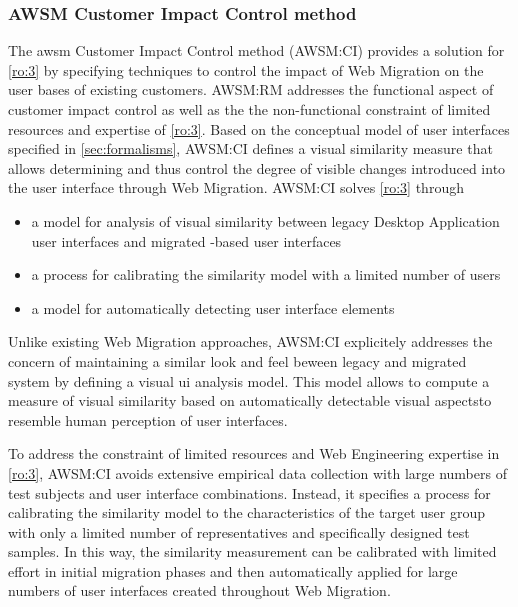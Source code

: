 \hypertarget{awsm-customer-impact-control-method}{%
\subsubsection*{AWSM Customer Impact Control method}\label{awsm-customer-impact-control-method}}

The \gls{awsm} Customer Impact Control method (AWSM:CI) provides a solution for \cref{ro:3} by specifying techniques to control the impact of \gls{Web Migration} on the user bases of existing customers. %
AWSM:RM addresses the functional aspect of customer impact control as well as the the non-functional constraint of limited resources and expertise of \cref{ro:3}.
Based on the conceptual model of  user interfaces specified in \cref{sec:formalisms}, AWSM:CI defines a visual similarity measure that allows determining and thus control the degree of visible changes introduced into the user interface through \gls{Web Migration}.
AWSM:CI solves \cref{ro:3} through
\begin{itemize}
\item a model for analysis of visual similarity between legacy \gls{Desktop Application} user interfaces and migrated -based user interfaces
\item a process for calibrating the similarity model with a limited number of users
\item a model for automatically detecting user interface elements
\end{itemize}

\par\smallskip
Unlike existing \gls{Web Migration} approaches, AWSM:CI explicitely addresses the concern of maintaining a similar look and feel beween legacy and migrated system by defining a visual \gls{ui} analysis model.
This model allows to compute a measure of visual similarity based on automatically detectable visual aspectsto resemble human perception of user interfaces.

To address the constraint of limited resources and \gls{Web Engineering} expertise in \cref{ro:3}, AWSM:CI avoids extensive empirical data collection with large numbers of test subjects and user interface combinations.
Instead, it specifies a process for calibrating the similarity model to the characteristics of the target user group with only a limited number of representatives and specifically designed test samples.
In this way, the similarity measurement can be calibrated with limited effort in initial migration phases and then automatically applied for large numbers of user interfaces created throughout \gls{Web Migration}.


